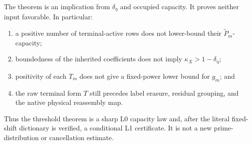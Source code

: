 The theorem is an implication from \(\delta_\eta\) and occupied capacity.
It proves neither input favorable.  In particular:
\begin{enumerate}[label=\textup{(\roman*)},leftmargin=3em]
 \item a positive number of terminal-active rows does not lower-bound
       their \(\widetilde P_m\)-capacity;
 \item boundedness of the inherited coefficients does not imply
       \(\kappa_X>1-\delta_\eta\);
 \item positivity of each \(T_m\) does not give a fixed-power lower bound
       for \(g_m\); and
 \item the raw terminal form \(T\) still precedes label erasure, residual
       grouping, and the native physical reassembly map.
\end{enumerate}
Thus the threshold theorem is a sharp L0 capacity law and, after the
literal fixed-shift dictionary is verified, a conditional L1
certificate.  It is not a new prime-distribution or cancellation
estimate.
